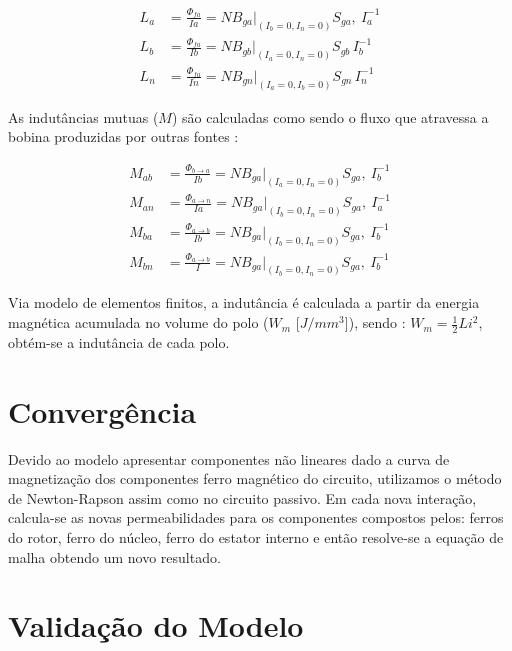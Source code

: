 \begin{align}
	L_{a} &= \frac{\Phi_{fa}}{Ia} = N B_{ga}\biggr\rvert_{(I_b = 0, I_n = 0)} S_{ga} ,\ I_a^{-1} \\
	L_{b} &= \frac{\Phi_{fa}}{Ib} = N B_{gb}\biggr\rvert_{(I_a = 0, I_n = 0)} S_{gb} \, I_b^{-1} \\
	L_{n} &= \frac{\Phi_{fa}}{In} = N B_{gn}\biggr\rvert_{(I_a = 0, I_b = 0)} S_{gn} \, I_n^{-1} %
\end{align}

As indutâncias mutuas ($M$) são calculadas como sendo o fluxo que atravessa a bobina produzidas por outras fontes :

\begin{align}
M_{ab} &= \frac{\Phi_{b \rightarrow a}}{Ib} = N B_{ga}\biggr\rvert_{(I_a = 0, I_n = 0)} S_{ga} ,\ I_b^{-1} \\
M_{an} &= \frac{\Phi_{a \rightarrow n}}{Ia} = N B_{ga}\biggr\rvert_{(I_b = 0, I_n = 0)} S_{ga} ,\ I_a^{-1} \\
M_{ba} &= \frac{\Phi_{a \rightarrow b}}{Ib} = N B_{ga}\biggr\rvert_{(I_b = 0, I_n = 0)} S_{ga} ,\ I_b^{-1} \\
M_{bn} &= \frac{\Phi_{a \rightarrow b}}{I} = N B_{ga}\biggr\rvert_{(I_b = 0, I_n = 0)} S_{ga} ,\ I_b^{-1} 
\end{align}

Via modelo de elementos finitos, a indutância é calculada a partir da energia magnética acumulada no volume do polo ($W_m$ [$J/mm^3$]), sendo : $W_m = \frac{1}{2} L i^2$, obtém-se a indutância de cada polo.

\section{Convergência}

Devido ao modelo apresentar componentes não lineares dado a curva de magnetização dos componentes ferro magnético do circuito, utilizamos o método de Newton-Rapson assim como no circuito passivo. Em cada nova interação, calcula-se as novas permeabilidades para os componentes compostos pelos: ferros do rotor, ferro do núcleo, ferro do estator interno e então resolve-se a equação de malha obtendo um novo resultado.

\section{Validação do Modelo}

